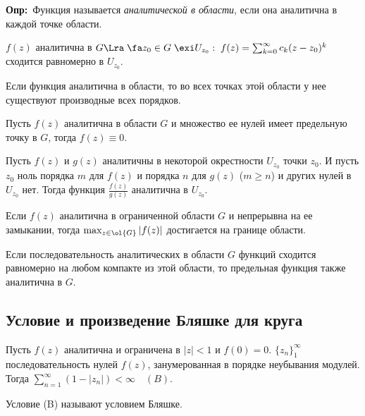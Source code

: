 \documentclass[a4paper]{article}
\def\defin{\noindent\textbf{Опр:}\ }
\begin{document}
\defin Функция называется \emph{аналитической в
области}, если она аналитична в каждой точке области.

\begin{theorems}
$f(z)$ аналитична в $G\Lra\;\fa z_0\in G\;\exi
U_{z_0}:\;f(z)=\sum_{k=0}^{\infty}c_k(z-z_0)^k$ сходится
равномерно в $U_{z_0}.$
\end{theorems}


\begin{theorems}
Если функция аналитична в области, то во всех точках этой области
у нее существуют производные всех порядков.
\end{theorems}

\begin{theorems}[Единственности]
Пусть $f(z)$ аналитична в области $G$ и множество ее нулей имеет
предельную точку в $G$, тогда $f(z)\equiv0.$
\end{theorems}

\begin{theorems}
Пусть $f(z)$ и $g(z)$ аналитичны в некоторой окрестности $U_{z_0}$
точки $z_0$. И пусть $z_0$ ноль порядка $m$ для $f(z)$ и порядка
$n$ для $g(z)$ ($m\ge n$) и других нулей в $U_{z_0}$ нет. Тогда
функция $\frac {f(z)}{g(z)}$ аналитична в $U_{z_0}$.
\end{theorems}

\begin{theorems}
Если $f(z)$ аналитична в ограниченной области $G$ и непрерывна на
ее замыкании, тогда $\max_{z\in \ol{G}}|f(z)|$ достигается
на границе области.
\end{theorems}

\begin{theorems}[Вейерштрасс]
Если последовательность аналитических в области $G$ функций
сходится равномерно на любом компакте из этой области, то
предельная функция также аналитична в $G.$
\end{theorems}

\subsection{Условие и произведение Бляшке для круга}
\begin{theorems}
Пусть $f(z)$ аналитична и ограничена в $|z|<1$ и $f(0)=0$.
$\{z_n\}_1^{\infty}$ последовательность нулей $f(z)$,
занумерованная в порядке неубывания модулей. Тогда
$\sum_{n=1}^{\infty}(1-|z_n|)<\infty\quad(B).$
\end{theorems}
Условие (B) называют условием Бляшке.
\end{document}
